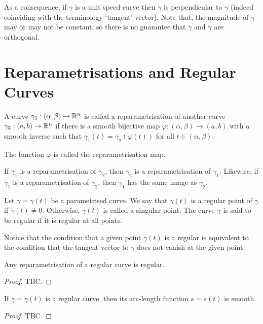 \documentclass[11pt]{penrose}
\newcommand{\keyword}[1]{\textsf{#1}}
\begin{document}
As a consequence, if $\gamma$ is a unit speed curve then $\dot{\gamma}$ is perpendicular to $\gamma$ (indeed coinciding with the terminology `tangent' vector). Note that, the magnitude of $\dot{\gamma}$ may or may not be constant; so there is no guarantee that $\ddot{\gamma}$ and $\dot{\gamma}$ are orthogonal.

\section{Reparametrisations and Regular Curves}
\begin{ndfn}
    A curve $\gamma_1 : (\alpha, \beta) \to \mathbb{R}^n$ is called a \keyword{reparametrisation} of another curve $\gamma_2 : (a, b) \to \mathbb{R}^n$ if there is a smooth bijective map $\varphi : (\alpha, \beta) \to (a, b)$ with a smooth inverse such that $\gamma_1(t) = \gamma_2( \varphi(t) )$ for all $t \in (\alpha, \beta)$.
\end{ndfn}

The function $\varphi$ is called the \keyword{reparametrisation map}.

If $\gamma_1$ is a reparametrisation of $\gamma_2$, then $\gamma_2$ is a reparametrisation of $\gamma_1$. Likewise, if $\gamma_1$ is a reparametrisation of $\gamma_2$, then $\gamma_1$ has the same image as $\gamma_2$.

\begin{ndfn}
    Let $\gamma = \gamma(t)$ be a parametrised curve. We say that $\gamma(t)$ is a \keyword{regular} point of $\gamma$ if $\dot{\gamma}(t) \neq 0$. Otherwise, $\gamma(t)$ is called a \keyword{singular} point. The curve $\gamma$ is said to be regular if it is regular at all points.
\end{ndfn}

Notice that the condition that a given point $\gamma(t)$ is a regular is equivalent to the condition that the tangent vector to $\gamma$ does not vanish at the given point.

\begin{nthm}
    Any reparametrisation of a regular curve is regular.
\end{nthm}
\begin{proof}
    TBC.
\end{proof}

\begin{nthm}
    If $\gamma = \gamma(t)$ is a regular curve, then its arc-length function $s = s(t)$ is smooth.
\end{nthm}
\begin{proof}
    TBC.
\end{proof}
\end{document}

